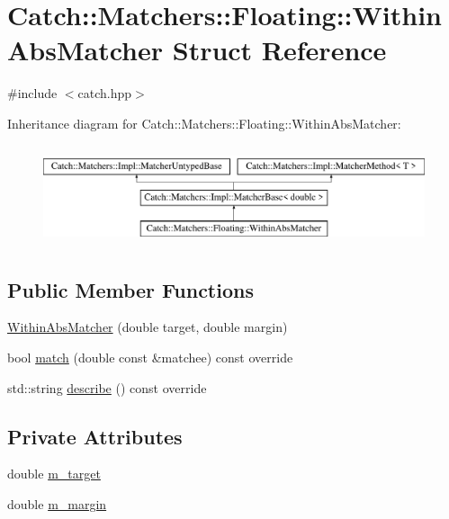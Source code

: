 \hypertarget{struct_catch_1_1_matchers_1_1_floating_1_1_within_abs_matcher}{}\section{Catch\+::Matchers\+::Floating\+::Within\+Abs\+Matcher Struct Reference}
\label{struct_catch_1_1_matchers_1_1_floating_1_1_within_abs_matcher}


{\ttfamily \#include $<$catch.\+hpp$>$}

Inheritance diagram for Catch\+::Matchers\+::Floating\+::Within\+Abs\+Matcher\+:\begin{figure}[H]
\begin{center}
\leavevmode
\includegraphics[height=2.968198cm]{struct_catch_1_1_matchers_1_1_floating_1_1_within_abs_matcher}
\end{center}
\end{figure}
\subsection*{Public Member Functions}
\begin{DoxyCompactItemize}
\item 
\mbox{\hyperlink{struct_catch_1_1_matchers_1_1_floating_1_1_within_abs_matcher_ac45340b98c41230a7def5bd86c2d870f}{Within\+Abs\+Matcher}} (double target, double margin)
\item 
bool \mbox{\hyperlink{struct_catch_1_1_matchers_1_1_floating_1_1_within_abs_matcher_afa5d8eed57f12c1e5d006471eb0bfe72}{match}} (double const \&matchee) const override
\item 
std\+::string \mbox{\hyperlink{struct_catch_1_1_matchers_1_1_floating_1_1_within_abs_matcher_a206a738680f8767af31d3f1835afff3f}{describe}} () const override
\end{DoxyCompactItemize}
\subsection*{Private Attributes}
\begin{DoxyCompactItemize}
\item 
double \mbox{\hyperlink{struct_catch_1_1_matchers_1_1_floating_1_1_within_abs_matcher_a8d9f249c0e2969cf0522dc81db6ff280}{m\+\_\+target}}
\item 
double \mbox{\hyperlink{struct_catch_1_1_matchers_1_1_floating_1_1_within_abs_matcher_a2270487cd55fa06044f5f6aaab724c5f}{m\+\_\+margin}}
\end{DoxyCompactItemize}
